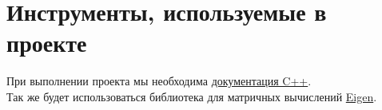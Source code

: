 \documentclass{article}
\begin{document}
\section{Инструменты, используемые в проекте}
При выполнении проекта мы необходима  \href{https://en.cppreference.com/w/}{документация C++}.\\
Так же будет использоваться библиотека для матричных вычислений \href{https://eigen.tuxfamily.org/dox/GettingStarted.html}{Eigen}.\\












\end{document}
